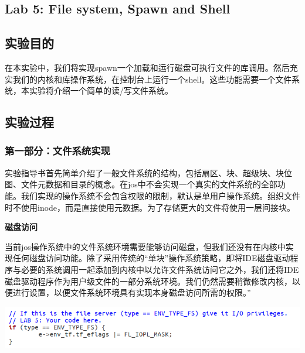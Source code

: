 \begin{ExerciseList}

  \setcounter{Exercise}{0}

  \section{Lab 5: File system, Spawn and Shell}

  \subsection{实验目的}

  在本实验中，我们将实现spawn一个加载和运行磁盘可执行文件的库调用。然后充实我们的内核和库操作系统，在控制台上运行一个shell。这些功能需要一个文件系统，本实验将介绍一个简单的读/写文件系统。

  \subsection{实验过程}

  \subsubsection{第一部分：文件系统实现}


  实验指导书首先简单介绍了一般文件系统的结构，包括扇区、块、超级块、块位图、文件元数据和目录的概念。在jos中不会实现一个真实的文件系统的全部功能。我们实现的操作系统不会包含权限的限制，默认是单用户操作系统。组织文件时不使用inode，而是直接使用元数据。为了存储更大的文件将使用一层间接块。

  \textbf{磁盘访问}

  当前jos操作系统中的文件系统环境需要能够访问磁盘，但我们还没有在内核中实现任何磁盘访问功能。除了采用传统的“单块”操作系统策略，即将IDE磁盘驱动程序与必要的系统调用一起添加到内核中以允许文件系统访问它之外，我们还将IDE磁盘驱动程序作为用户级文件的一部分系统环境。我们仍然需要稍微修改内核，以便进行设置，以便文件系统环境具有实现本身磁盘访问所需的权限。”



  \includegraphics[width=6in]{figures/lab5/image64.png}


\end{ExerciseList}
